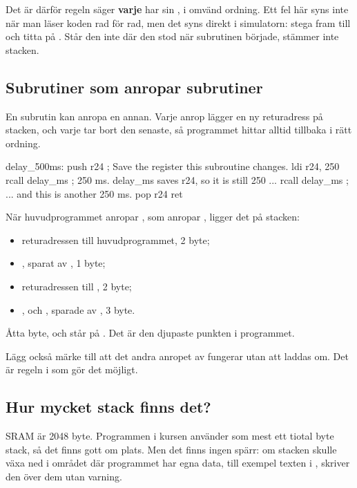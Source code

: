Det är därför regeln säger \textbf{varje}  har sin , i omvänd ordning. Ett fel
här syns inte när man läser koden rad för rad, men det syns direkt i simulatorn: stega fram till
 och titta på . Står den inte där den stod när subrutinen började, stämmer inte
stacken.

\subsection{Subrutiner som anropar subrutiner}
\label{c10:c7}
En subrutin kan anropa en annan. Varje anrop lägger en ny returadress på stacken, och varje
 tar bort den senaste, så programmet hittar alltid tillbaka i rätt ordning.

\begin{asmcode}
delay_500ms:
    push r24                        ; Save the register this subroutine changes.
    ldi r24, 250
    rcall delay_ms                  ; 250 ms. delay_ms saves r24, so it is still 250 ...
    rcall delay_ms                  ; ... and this is another 250 ms.
    pop r24
    ret
\end{asmcode}

\noindent När huvudprogrammet anropar , som anropar , ligger det
på stacken:
\begin{itemize}
  \item returadressen till huvudprogrammet, 2 byte;
  \item {}, sparat av , 1 byte;
  \item returadressen till , 2 byte;
  \item {},  och , sparade av , 3 byte.
\end{itemize}

Åtta byte, och  står på . Det är den djupaste punkten i
programmet.

Lägg också märke till att det andra anropet av  fungerar utan att  laddas
om. Det är regeln i  som gör det möjligt.

\subsection{Hur mycket stack finns det?}
\label{c10:c8}
SRAM är 2048 byte. Programmen i kursen använder som mest ett tiotal byte stack, så det finns gott
om plats. Men det finns ingen spärr: om stacken skulle växa ned i området där programmet har egna
data, till exempel texten i , skriver den över dem utan varning.

